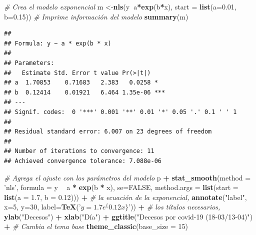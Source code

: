 \documentclass[]{article}
\newenvironment{Shaded}{\begin{snugshade}}{\end{snugshade}}
\newcommand{\CommentTok}[1]{\textcolor[rgb]{0.56,0.35,0.01}{\textit{#1}}}
\newcommand{\DataTypeTok}[1]{\textcolor[rgb]{0.13,0.29,0.53}{#1}}
\newcommand{\DecValTok}[1]{\textcolor[rgb]{0.00,0.00,0.81}{#1}}
\newcommand{\FloatTok}[1]{\textcolor[rgb]{0.00,0.00,0.81}{#1}}
\newcommand{\KeywordTok}[1]{\textcolor[rgb]{0.13,0.29,0.53}{\textbf{#1}}}
\newcommand{\NormalTok}[1]{#1}
\newcommand{\OperatorTok}[1]{\textcolor[rgb]{0.81,0.36,0.00}{\textbf{#1}}}
\newcommand{\OtherTok}[1]{\textcolor[rgb]{0.56,0.35,0.01}{#1}}
\newcommand{\StringTok}[1]{\textcolor[rgb]{0.31,0.60,0.02}{#1}}
\begin{document}
\begin{Shaded}
\begin{Highlighting}[]
\CommentTok{# Crea el modelo exponencial}
\NormalTok{m <-}\KeywordTok{nls}\NormalTok{(y}\OperatorTok{~}\NormalTok{a}\OperatorTok{*}\KeywordTok{exp}\NormalTok{(b}\OperatorTok{*}\NormalTok{x), }\DataTypeTok{start =} \KeywordTok{list}\NormalTok{(}\DataTypeTok{a=}\FloatTok{0.01}\NormalTok{, }\DataTypeTok{b=}\FloatTok{0.15}\NormalTok{))}
\CommentTok{# Imprime información del modelo}
\KeywordTok{summary}\NormalTok{(m)}
\end{Highlighting}
\end{Shaded}

\begin{verbatim}
## 
## Formula: y ~ a * exp(b * x)
## 
## Parameters:
##   Estimate Std. Error t value Pr(>|t|)    
## a  1.70853    0.71683   2.383   0.0258 *  
## b  0.12414    0.01921   6.464 1.35e-06 ***
## ---
## Signif. codes:  0 '***' 0.001 '**' 0.01 '*' 0.05 '.' 0.1 ' ' 1
## 
## Residual standard error: 6.007 on 23 degrees of freedom
## 
## Number of iterations to convergence: 11 
## Achieved convergence tolerance: 7.088e-06
\end{verbatim}

\begin{Shaded}
\begin{Highlighting}[]
\CommentTok{# Agrega el ajuste con los parámetros del modelo}
\NormalTok{p }\OperatorTok{+}
\StringTok{  }\KeywordTok{stat_smooth}\NormalTok{(}\DataTypeTok{method =} \StringTok{'nls'}\NormalTok{, }\DataTypeTok{formula =}\NormalTok{ y }\OperatorTok{~}\StringTok{ }\NormalTok{a }\OperatorTok{*}\StringTok{ }\KeywordTok{exp}\NormalTok{(b }\OperatorTok{*}\StringTok{ }\NormalTok{x), }\DataTypeTok{se=}\OtherTok{FALSE}\NormalTok{,}
              \DataTypeTok{method.args =} \KeywordTok{list}\NormalTok{(}\DataTypeTok{start =} \KeywordTok{list}\NormalTok{(}\DataTypeTok{a =} \FloatTok{1.7}\NormalTok{, }\DataTypeTok{b =}  \FloatTok{0.12}\NormalTok{))) }\OperatorTok{+}
\CommentTok{# la ecuación de la exponencial,}
\StringTok{      }\KeywordTok{annotate}\NormalTok{(}\StringTok{"label"}\NormalTok{, }\DataTypeTok{x=}\DecValTok{5}\NormalTok{, }\DataTypeTok{y=}\DecValTok{30}\NormalTok{, }\DataTypeTok{label=}\KeywordTok{TeX}\NormalTok{(}\StringTok{'$y  =  1.7  e^\{0.12  x \}$'}\NormalTok{)) }\OperatorTok{+}
\CommentTok{# los títulos necesarios,}
\StringTok{  }\KeywordTok{ylab}\NormalTok{(}\StringTok{"Decesos"}\NormalTok{) }\OperatorTok{+}\StringTok{ }\KeywordTok{xlab}\NormalTok{(}\StringTok{"Día"}\NormalTok{) }\OperatorTok{+}\StringTok{  }\KeywordTok{ggtitle}\NormalTok{(}\StringTok{"Decesos por covid-19 (18-03/13-04)"}\NormalTok{) }\OperatorTok{+}
\CommentTok{# Cambia el tema base }
\StringTok{  }\KeywordTok{theme_classic}\NormalTok{(}\DataTypeTok{base_size =} \DecValTok{15}\NormalTok{)}
\end{Highlighting}
\end{Shaded}
\end{document}
